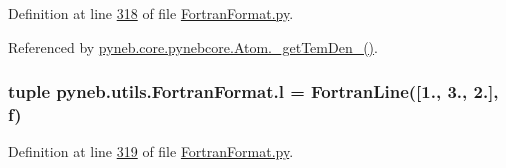Definition at line \hyperlink{_fortran_format_8py_source_l00318}{318} of file \hyperlink{_fortran_format_8py_source}{Fortran\+Format.\+py}.



Referenced by \hyperlink{pynebcore_8py_source_l01803}{pyneb.\+core.\+pynebcore.\+Atom.\+\_\+get\+Tem\+Den\+\_()}.

\hypertarget{namespacepyneb_1_1utils_1_1_fortran_format_a80ea829e31363f67a89c70955e194b93}{}
\subsubsection[{l}]{\setlength{\rightskip}{0pt plus 5cm}tuple pyneb.\+utils.\+Fortran\+Format.\+l = {\bf Fortran\+Line}(\mbox{[}1., 3., 2.\mbox{]}, {\bf f})}\label{namespacepyneb_1_1utils_1_1_fortran_format_a80ea829e31363f67a89c70955e194b93}


Definition at line \hyperlink{_fortran_format_8py_source_l00319}{319} of file \hyperlink{_fortran_format_8py_source}{Fortran\+Format.\+py}.

